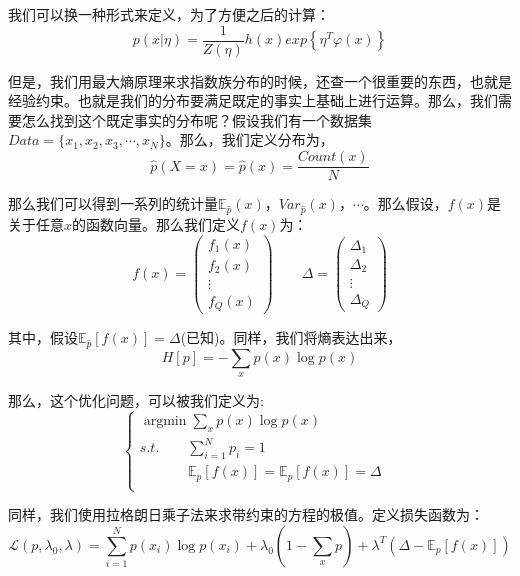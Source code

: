 \documentclass[a4paper]{article}
\DeclareMathOperator*{\argmin}{argmin}
\begin{document}
我们可以换一种形式来定义，为了方便之后的计算：
\begin{equation}
    p(x|\eta)=\frac{1}{Z(\eta)}h(x)exp\left\{ \eta^T\varphi(x) \right\}
\end{equation}

但是，我们用最大熵原理来求指数族分布的时候，还查一个很重要的东西，也就是经验约束。也就是我们的分布要满足既定的事实上基础上进行运算。那么，我们需要怎么找到这个既定事实的分布呢？假设我们有一个数据集$Data = \{x_1, x_2, x_3, \cdots, x_N\}$。那么，我们定义分布为，
\begin{equation}
    \hat{p}(X=x)=\hat{p}(x)=\frac{Count(x)}{N}
\end{equation}

那么我们可以得到一系列的统计量$\mathbb{E}_{\hat{p}}(x)$，$Var_{\hat{p}}(x)$，$\cdots$。那么假设，$f(x)$是关于任意$x$的函数向量。那么我们定义$f(x)$为：
\begin{equation}
    f(x) = 
    \begin{pmatrix}
        f_1(x) \\
        f_2(x) \\
        \vdots \\
        f_Q(x) 
    \end{pmatrix}
    \qquad
    \Delta = 
    \begin{pmatrix}
        \Delta_1 \\
        \Delta_2 \\
        \vdots \\
        \Delta_Q 
    \end{pmatrix}
\end{equation}

其中，假设$\mathbb{E}_{\hat{p}}[f(x)]=\Delta$(已知)。同样，我们将熵表达出来，
\begin{equation}
    H[p] = - \sum_x p(x)\log p(x)
\end{equation}

那么，这个优化问题，可以被我们定义为:
\begin{equation}
    \left\{
    \begin{array}{lll}
          \mathop{\argmin} \sum_x p(x)\log p(x) & \\
         s.t. \qquad \sum_{i=1}^Np_i=1 & \\
         \qquad \quad \ \ \mathbb{E}_p[f(x)]=\mathbb{E}_{\hat{p}}[f(x)]=\Delta & \\
    \end{array}
    \right.
\end{equation}

同样，我们使用拉格朗日乘子法来求带约束的方程的极值。定义损失函数为：
\begin{equation}
    \mathcal{L}(p,\lambda_0, \lambda) = \sum_{i=1}^N p(x_i)\log p(x_i) + \lambda_0(1-\sum_{x} p)+\lambda^T(\Delta - \mathbb{E}_p[f(x)])
\end{equation}
\end{document}
